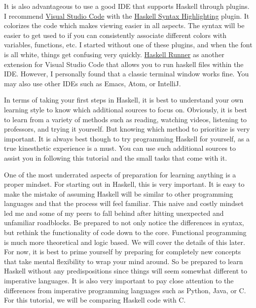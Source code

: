 \documentclass{article}
\begin{document}
\medskip\noindent
It is also advantageous to use a good IDE that supports Haskell through plugins. I recommend \href{https://code.visualstudio.com/}{Visual Studio Code} with the \href{https://marketplace.visualstudio.com/items?itemName=justusadam.language-haskell}{Haskell Syntax Highlighting} plugin. It colorizes the code which makes viewing easier in all aspects. The syntax will be easier to get used to if you can consistently associate different colors with variables, functions, etc. I started without one of these plugins, and when the font is all white, things get confusing very quickly. \href{https://marketplace.visualstudio.com/items?itemName=Meowcolm024.has-go}{Haskell Runner} as another extension for Visual Studio Code that allows you to run haskell files within the IDE. However, I personally found that a classic terminal window works fine. You may also use other IDEs such as Emacs, Atom, or IntelliJ.

\medskip\noindent
In terms of taking your first steps in Haskell, it is best to understand your own learning style to know which additional sources to focus on. Obviously, it is best to learn from a variety of methods such as reading, watching videos, listening to professors, and trying it yourself. But knowing which method to prioritize is very important. It is always best though to try programming Haskell for yourself, as a true kinesthetic experience is a must. You can use such additional sources to assist you in following this tutorial and the small tasks that come with it.

\medskip\noindent
One of the most underrated aspects of preparation for learning anything is a proper mindset. For starting out in Haskell, this is very important. It is easy to make the mistake of assuming Haskell will be similar to other programming languages and that the process will feel familiar. This naive and costly mindset led me and some of my peers to fall behind after hitting unexpected and unfamiliar roadblocks. Be prepared to not only notice the differences in syntax, but rethink the functionality of code down to the core. Functional programming is much more theoretical and logic based. We will cover the details of this later. For now, it is best to prime yourself by preparing for completely new concepts that take mental flexibility to wrap your mind around. So be prepared to learn Haskell without any predispositions since things will seem somewhat different to imperative languages. It is also very important to pay close attention to the differences from imperative programming languages such as Python, Java, or C. For this tutorial, we will be comparing Haskell code with C.
\end{document}

